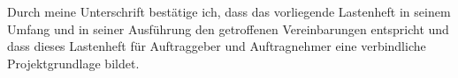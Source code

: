 \vspace{0.75cm}
Durch meine Unterschrift bestätige ich, dass das vorliegende Lastenheft in seinem Umfang und in seiner Ausführung den getroffenen Vereinbarungen entspricht 
und dass dieses Lastenheft für Auftraggeber und Auftragnehmer eine verbindliche Projektgrundlage bildet.
\vspace{2.5cm}
\begin{center}
\end{center}
 
    